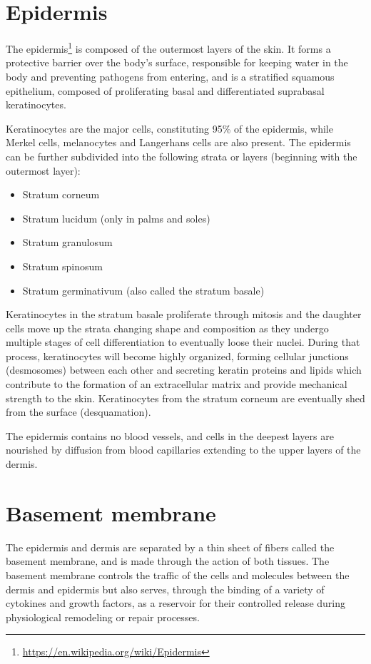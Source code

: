 \documentclass[]{book}
\providecommand{\tightlist}{%
  \setlength{\itemsep}{0pt}\setlength{\parskip}{0pt}}
\let\rmarkdownfootnote\footnote%
\def\footnote{\protect\rmarkdownfootnote}
\renewcommand{\href}[2]{#2\footnote{\url{#1}}}
\theoremstyle{definition}
\theoremstyle{definition}
\theoremstyle{definition}
\theoremstyle{remark}
\begin{document}
\section{Epidermis}\label{epidermis}

The \href{https://en.wikipedia.org/wiki/Epidermis}{epidermis} is
composed of the outermost layers of the skin. It forms a protective
barrier over the body's surface, responsible for keeping water in the
body and preventing pathogens from entering, and is a stratified
squamous epithelium, composed of proliferating basal and differentiated
suprabasal keratinocytes.

Keratinocytes are the major cells, constituting 95\% of the epidermis,
while Merkel cells, melanocytes and Langerhans cells are also present.
The epidermis can be further subdivided into the following strata or
layers (beginning with the outermost layer):

\begin{itemize}
\tightlist
\item
  Stratum corneum
\item
  Stratum lucidum (only in palms and soles)
\item
  Stratum granulosum
\item
  Stratum spinosum
\item
  Stratum germinativum (also called the stratum basale)
\end{itemize}

Keratinocytes in the stratum basale proliferate through mitosis and the
daughter cells move up the strata changing shape and composition as they
undergo multiple stages of cell differentiation to eventually loose
their nuclei. During that process, keratinocytes will become highly
organized, forming cellular junctions (desmosomes) between each other
and secreting keratin proteins and lipids which contribute to the
formation of an extracellular matrix and provide mechanical strength to
the skin. Keratinocytes from the stratum corneum are eventually shed
from the surface (desquamation).

The epidermis contains no blood vessels, and cells in the deepest layers
are nourished by diffusion from blood capillaries extending to the upper
layers of the dermis.

\section{Basement membrane}\label{basement-membrane}

The epidermis and dermis are separated by a thin sheet of fibers called
the basement membrane, and is made through the action of both tissues.
The basement membrane controls the traffic of the cells and molecules
between the dermis and epidermis but also serves, through the binding of
a variety of cytokines and growth factors, as a reservoir for their
controlled release during physiological remodeling or repair processes.
\end{document}
